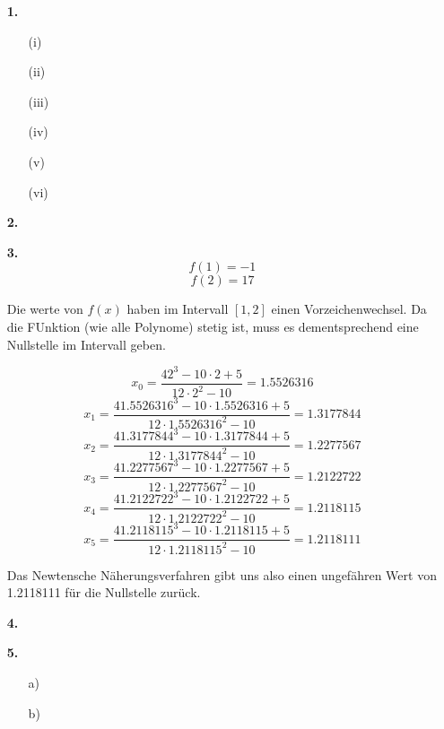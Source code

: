\documentclass[a4paper,11pt]{scrartcl}
\author{\authorinfo}
\title{\titleinfo}
\date{\today}
\begin{document}
\maketitle
\begin{enumerate}
    \item[\textbf{1.}]
        \begin{enumerate}
            \item[(i)] 
            \item[(ii)] 
            \item[(iii)]
            \item[(iv)] 
            \item[(v)]  
            \item[(vi)] 
        \end{enumerate}

    \item[\textbf{2.}]


    \item[\textbf{3.}]
        \[ f(1) = -1 \]
        \[ f(2) = 17 \]

        Die werte von $f(x)$ haben im Intervall $[1,2]$ einen Vorzeichenwechsel. Da die FUnktion (wie alle Polynome) stetig ist,
        muss es dementsprechend eine Nullstelle im Intervall geben.

        \[ x_0 = \frac{42^3 - 10 \cdot 2 + 5}{12 \cdot 2^2 - 10} = 1.5526316\]
        \[ x_1 = \frac{41.5526316^3 - 10 \cdot 1.5526316 + 5}{12 \cdot 1.5526316^2 - 10} = 1.3177844\]
        \[ x_2 = \frac{41.3177844^3 - 10 \cdot 1.3177844 + 5}{12 \cdot 1.3177844^2 - 10} = 1.2277567\]
        \[ x_3 = \frac{41.2277567^3 - 10 \cdot 1.2277567 + 5}{12 \cdot 1.2277567^2 - 10} = 1.2122722\]
        \[ x_4 = \frac{41.2122722^3 - 10 \cdot 1.2122722 + 5}{12 \cdot 1.2122722^2 - 10} = 1.2118115\]
        \[ x_5 = \frac{41.2118115^3 - 10 \cdot 1.2118115 + 5}{12 \cdot 1.2118115^2 - 10} = 1.2118111\]

        Das Newtensche Näherungsverfahren gibt uns also einen ungefähren Wert von 1.2118111 für die Nullstelle zurück.

    \newpage
    \item[\textbf{4.}]
    \item[\textbf{5.}]
        \begin{enumerate}
            \item[a)]
            \item[b)]
        \end{enumerate}
    \end{enumerate}
\end{document}
